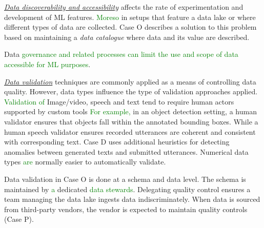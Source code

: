 \underline{\emph{Data discoverability and accessibility}}
affects the rate of experimentation and development of ML features. \textcolor{green}{Moreso} in setups that feature a data lake or where different types of data are collected. Case O describes a solution to this problem based on maintaining a \textit{data catalogue} where data and its value are described. %

Data \textcolor{green}{governance and related processes can limit the use and scope of data accessible for ML purposes}.


\underline{\emph{Data validation}}
techniques are commonly applied as a means of controlling data quality. However, data types influence the type of validation approaches applied. \textcolor{green}{Validation of }Image/video, speech and text tend to require human actors supported by custom tools \textcolor{green}{For example,} in an object detection setting, a human validator ensures that objects fall within the annotated bounding boxes. \textcolor{greed}{While a human speech validator} ensures recorded utterances are coherent and consistent with corresponding text. Case D uses additional heuristics for detecting anomalies between generated texts and submitted utterances. Numerical data types \textcolor{green}{are} normally easier to automatically validate.

Data validation in Case O is done at a schema and data level. The schema is maintained by \textcolor{green}{a} dedicated \textcolor{green}{data stewards}. Delegating quality control ensures a team managing the data lake ingests data indiscriminately. When data is sourced from third-party vendors, the vendor is expected to maintain quality controls (Case P). %

